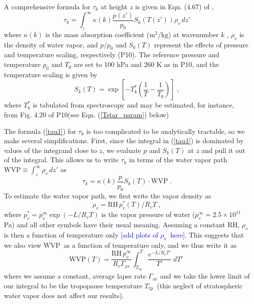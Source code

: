 \documentclass[10pt]{article}
\newcommand{\comment}[1]{\textcolor{blue}{[{#1}]}}
\newcommand{\beqn}{\begin{equation}}
\newcommand{\eeqn}{\end{equation}}
\newcommand{\eqnref}[1]{(\ref{#1})}
\newcommand{\pierre}{P10}
\newcommand{\rhov}{\ensuremath{\rho_\mathrm{v}}}
\newcommand{\RH}{\ensuremath{\mathrm{RH}}}
\newcommand{\WVP}{\ensuremath{\mathrm{WVP}}}
\newcommand{\Ttp}{\ensuremath{T_\mathrm{tp}}}
\newcommand{\gammaav}{\ensuremath{\Gamma_\mathrm{av}}}
\begin{document}
A comprehensive formula for $\tau_k$ at height $z$ is given in  Eqn. (4.67) of \cite[][hereafter \pierre]{pierrehumbert2010},
	\beqn
		\tau_k = \int_z^\infty \kappa(k) \frac{p(z')}{p_0}S_k(T(z')) \rho_v\, dz'  
		\label{tau1}
	\eeqn
where $\kappa(k)$ is the mass absorption coefficient ($\mathrm{m^2/kg}$) at wavenumber $k$ , $\rho_v$ is the density of water vapor, and $p/p_0$ and $S_k(T)$ represent the effects of pressure and temperature scaling, respectively (\pierre). The reference pressure and temperature $p_0$ and $T_0$ are set to 100 hPa and 260 K as in \pierre, and the temperature scaling  is given by 
	\beqn
		S_k(T) =  \exp\left[-T_k^*\left(\frac{1}{T}-\frac{1}{T_0}\right)\right]\; ,  
		\label{Tscaling}
	\eeqn
	where $T_k^*$ is tabulated from spectroscopy and may be estimated, for instance, from Fig. 4.20 of \pierre (see Eqn. \eqnref{Tstar_param} below) 


The formula  \eqnref{tau1} for $\tau_k$ is too complicated to be analytically tractable, so  we make several simplifications.  First, since the integral in \eqnref{tau1} is dominated by values of the integrand close to $z$, we evaluate $p$ and $S_k(T)$ at $z$ and pull it out of the integral. This allows us to write $\tau_k$ in terms of the water vapor path $\WVP\equiv \int_z^\infty  \rho_v\, dz'$ as
	\beqn
		\tau_k =  \kappa(k) \frac{p}{p_0} S_k(T)\cdot \WVP \; .
	\label{tauWVP}
	\eeqn
To estimate the water vapor path, we first write the vapor density as 
	\beqn
		\rho_v =  \RH\, p_v^*(T)/R_ vT \; ,
	\label{rhov}
	\eeqn
	 where $p_v^* = p_v^\infty \exp(-L/R_vT)$ is the vapor pressure of water ($p_v^\infty = 2.5\times 10^{11} $ Pa) and all other symbols have their usual meaning. Assuming a constant  \RH,  $\rho_v$ is then a function of temperature only \comment{add plots of \rhov\ here}. This suggests that we also view \WVP\ as a function of temperature only, and we thus write it as 
	\beqn
		\WVP(T) =\frac{ \RH\, p_v^\infty}{R_v \gammaav}\int^T_{\Ttp} \frac{e^{-L/R_v T'}}{T'}\; dT' \; 
	\label{WVP1}
	\eeqn	
where we assume a constant, average lapse rate $\gammaav$ and we take the lower limit of our integral to be the tropopause temperature \Ttp\ (this neglect of stratospheric water vapor does not affect our results). 
\end{document}
